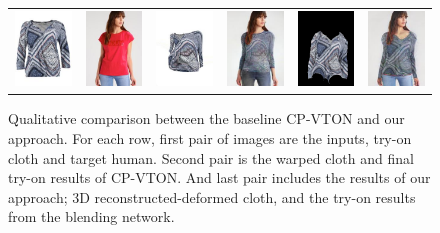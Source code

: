 \begin{figure}[t]
\begin{tabular}{cc|cc|cc}
\includegraphics[width=2cm]{figures/cloth/016962_1.jpg}&
\includegraphics[width=2cm]{figures/image/019402_0.jpg}&
\includegraphics[width=2cm]{figures/cp-vton/warp-cloth/016962_1_019402_0.jpg}&
\includegraphics[width=2cm]{figures/cp-vton/try-on/016962_1_019402_0.jpg}&
\includegraphics[width=2cm]{figures/c3dwfull/016962_1_019402_0.png}&
\includegraphics[width=2cm]{figures/try-on/016962_1_019402_0.jpg}\\

\end{tabular}

    \caption{Qualitative comparison between the baseline CP-VTON\cite{Wang2018TowardCI} and our approach. For each row, first pair of images are the inputs, try-on cloth and target human. Second pair is the warped cloth and final try-on results of CP-VTON\cite{Wang2018TowardCI}. And last pair includes the results of our approach; 3D reconstructed-deformed cloth, and the try-on results from the blending network.}
    \label{fig:testresults}
\end{figure}




